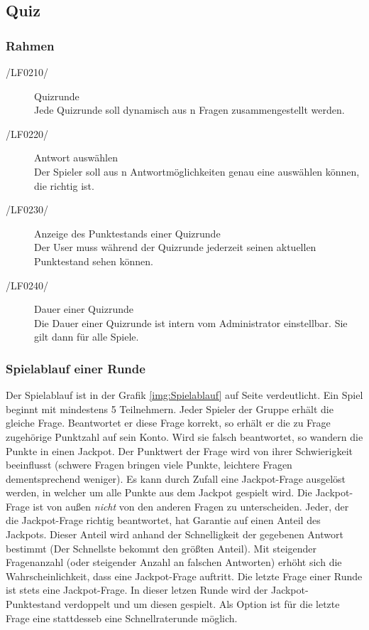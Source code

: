 \documentclass[11pt,a4paper]{scrreprt}
\begin{document}
\subsection{Quiz}

\subsubsection{Rahmen}
\begin{description}

\item[/LF0210/] Quizrunde \\
Jede Quizrunde soll dynamisch aus n Fragen zusammengestellt werden.

\item[/LF0220/] Antwort auswählen \\
Der Spieler soll aus n Antwortmöglichkeiten genau eine auswählen können, die richtig ist.

\item[/LF0230/]Anzeige des Punktestands einer Quizrunde \\ 
Der User muss während der Quizrunde jederzeit seinen aktuellen Punktestand sehen können.

\item[/LF0240/] Dauer einer Quizrunde \\
Die Dauer einer Quizrunde ist intern vom Administrator einstellbar. Sie gilt dann für alle Spiele.
\end{description}

\subsubsection{Spielablauf einer Runde}
Der Spielablauf ist in der Grafik \ref{img:Spielablauf} auf Seite \pageref{img:Spielablauf} verdeutlicht.
Ein Spiel beginnt mit mindestens 5 Teilnehmern. Jeder Spieler der Gruppe erhält die gleiche Frage. Beantwortet er diese Frage korrekt, so erhält er die zu Frage zugehörige Punktzahl auf sein Konto. Wird sie falsch beantwortet, so wandern die Punkte in einen Jackpot. Der Punktwert der Frage wird von ihrer Schwierigkeit beeinflusst (schwere Fragen bringen viele Punkte, leichtere Fragen dementsprechend weniger). Es kann durch Zufall eine Jackpot-Frage ausgelöst werden, in welcher um alle Punkte aus dem Jackpot gespielt wird. Die Jackpot-Frage ist von außen \textit{nicht} von den anderen Fragen zu unterscheiden. Jeder, der die Jackpot-Frage richtig beantwortet, hat Garantie auf einen Anteil des Jackpots. Dieser Anteil wird anhand der Schnelligkeit der gegebenen Antwort bestimmt (Der Schnellste bekommt den größten Anteil). Mit steigender Fragenanzahl (oder steigender Anzahl an falschen Antworten) erhöht sich die Wahrscheinlichkeit, dass eine Jackpot-Frage auftritt. Die letzte Frage einer Runde ist stets eine Jackpot-Frage. In dieser letzen Runde wird der Jackpot-Punktestand verdoppelt und um diesen gespielt. Als Option ist für die letzte Frage eine stattdesseb eine Schnellraterunde möglich.
\end{document}
